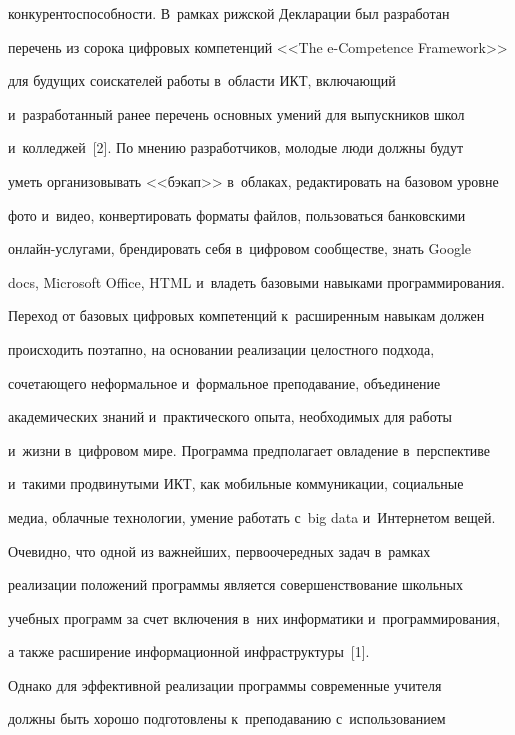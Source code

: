 конкурентоспособности. В~рамках рижской Декларации был разработан 


перечень из сорока цифровых компетенций <<The e-Competence Framework>> 


для будущих соискателей работы в~области ИКТ, включающий 


и~разработанный ранее перечень основных умений для выпускников школ 


и~колледжей~[2]. По мнению разработчиков, молодые люди должны будут 


уметь организовывать <<бэк\-ап>> в~облаках, редактировать на базовом уровне 


фото и~видео, конвертировать форматы файлов, пользоваться банковскими  


он\-лайн-услу\-га\-ми, брендировать себя в~цифровом сообществе, знать Google 


docs, Microsoft Office, HTML и~владеть базовыми навыками программирования. 





Переход от базовых цифровых компетенций к~расширенным навыкам должен 


происходить поэтапно, на основании реализации целостного подхода, 


сочетающего неформальное и~формальное преподавание, объединение 


академических знаний и~практического опыта, необходимых для работы 


и~жизни в~цифровом мире. Программа предполагает овладение в~перспективе 


и~такими продвинутыми ИКТ, как мобильные коммуникации, социальные 


медиа, облачные технологии, умение работать с~big data и~Интернетом вещей. 


Очевидно, что одной из важнейших, первоочередных задач в~рамках 


реализации положений программы является совершенствование школьных 


учебных программ за счет включения в~них информатики и~программирования, 


а также расширение информационной инфраструктуры~[1]. 


  


  Однако для эффективной реализации программы современные учителя 


должны быть хорошо подготовлены к~преподаванию с~использованием 


